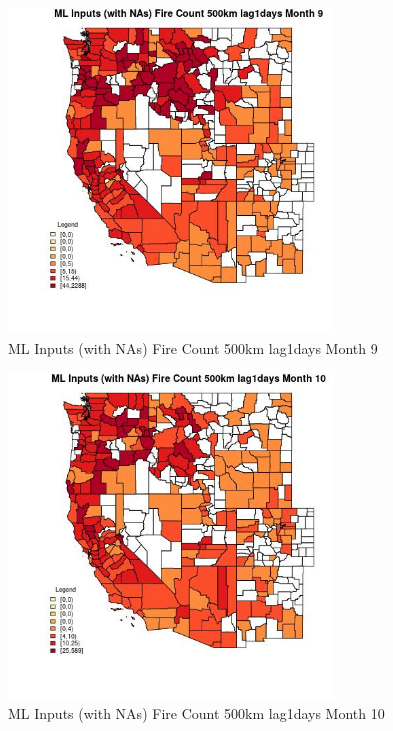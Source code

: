 \begin{figure} 
\centering  
\includegraphics[width=0.77\textwidth]{Code_Outputs/Report_ML_input_PM25_Step4_part_e_de_duplicated_aves_compiled_2019-05-21wNAs_CountyFire_Count_500km_lag1daysmedianMonth9.jpg} 
\caption{\label{fig:Report_ML_input_PM25_Step4_part_e_de_duplicated_aves_compiled_2019-05-21wNAsCountyFire_Count_500km_lag1daysmedianMonth9}ML Inputs (with NAs) Fire Count 500km lag1days Month 9} 
\end{figure} 
 

\begin{figure} 
\centering  
\includegraphics[width=0.77\textwidth]{Code_Outputs/Report_ML_input_PM25_Step4_part_e_de_duplicated_aves_compiled_2019-05-21wNAs_CountyFire_Count_500km_lag1daysmedianMonth10.jpg} 
\caption{\label{fig:Report_ML_input_PM25_Step4_part_e_de_duplicated_aves_compiled_2019-05-21wNAsCountyFire_Count_500km_lag1daysmedianMonth10}ML Inputs (with NAs) Fire Count 500km lag1days Month 10} 
\end{figure} 
 


